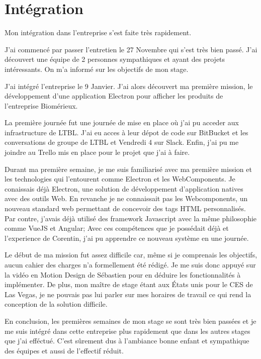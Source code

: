 \documentclass{article}
\begin{document}
\section{Intégration}

Mon intégration dans l'entreprise s'est faite très rapidement.

J'ai commencé par passer l'entretien le 27 Novembre qui s'est très bien passé.
J'ai découvert une équipe de 2 personnes sympathiques et ayant des projets intéressants.
On m'a informé sur les objectifs de mon stage.

J'ai intégré l'entreprise le 9 Janvier.
J'ai alors découvert ma première mission, le développement d'une application Electron pour afficher les produits de l'entreprise Biomérieux.

La première journée fut une journée de mise en place où j'ai pu acceder aux infrastructure de LTBL.
J'ai eu acces à leur dépot de code sur BitBucket et les conversations de groupe de LTBL et Vendredi 4 sur Slack.
Enfin, j'ai pu me joindre au Trello mis en place pour le projet que j'ai à faire.

Durant ma première semaine, je me suis familiarisé avec ma première mission et les technologies qui l'entourent comme Electron et les WebComponents.
Je conaissais déjà Electron, une solution de développement d'application natives avec des outils Web.
En revanche je ne connaissait pas les Webcomponents, un nouveau standard web permettant de concevoir des tags HTML personnalisés.
Par contre, j'avais déjà utilisé des framework Javascript avec la même philosophie comme VueJS et Angular;
Avec ces compétences que je possédait déjà et l'experience de Corentin, j'ai pu apprendre ce nouveau système en une journée.

Le début de ma mission fut assez difficile car, même si je comprenais les objectifs, aucun cahier des charges n'a formellement été rédigé.
Je me suis donc appuyé sur la vidéo en Motion Design de Sébastien pour en déduire les fonctionnalités à implémenter.
De plus, mon maître de stage étant aux États unis pour le CES de Las Vegas, je ne pouvais pas lui parler sur mes horaires de travail ce qui rend la conception de la solution difficile.

En conclusion, les premières semaines de mon stage se sont très bien passées et je me suis intégré dans cette entreprise plus rapidement que dans les autres stages que j'ai efféctué.
C'est sûrement dus à l'ambiance bonne enfant et sympathique des équipes et aussi de l'effectif réduit.
\end{document}
